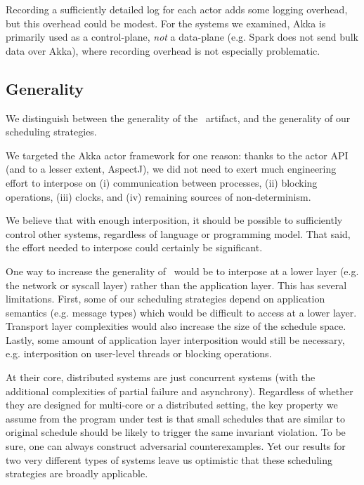 Recording a sufficiently detailed log for each actor adds
some logging overhead, but this overhead could be modest. For the systems
we examined, Akka is primarily used as a control-plane, {\em not} a
data-plane (e.g. Spark does not send bulk data over Akka), where
recording overhead is not especially problematic.


\subsection{Generality}
\label{subsec:generality}

We distinguish between the generality of the
\sys~artifact, and the generality of our scheduling strategies.

 We targeted the Akka actor framework
for one reason: thanks to the actor API (and to a lesser extent, AspectJ), we did not need to exert much
engineering effort to interpose on (i) communication
between processes, (ii) blocking operations, (iii) clocks, and (iv) remaining sources of non-determinism.

We believe that with enough interposition, it should be possible to
sufficiently control other systems, regardless of language or
programming model. That said, the effort needed to interpose could certainly be
significant.

One way to increase the generality of \sys~would be to interpose at a lower layer (e.g.
the network or syscall layer) rather than the application layer. This has
several limitations. First, some of our scheduling strategies depend on application
semantics (e.g. message types) which would be difficult to access at a lower
layer. Transport layer complexities would also increase the size of the schedule
space. Lastly, some amount of application layer interposition would still be
necessary, e.g. interposition on user-level threads or blocking operations.

 At their core, distributed
systems are just concurrent systems (with the additional complexities of partial
failure and asynchrony). Regardless of whether they are designed for
multi-core or a distributed setting, the key property we assume from the
program under test is that small schedules that are similar to
original schedule should be likely to trigger the same invariant
violation. To be sure, one can always construct adversarial counterexamples.
Yet our results for two very different types of systems leave us
optimistic that these scheduling strategies are broadly applicable.
